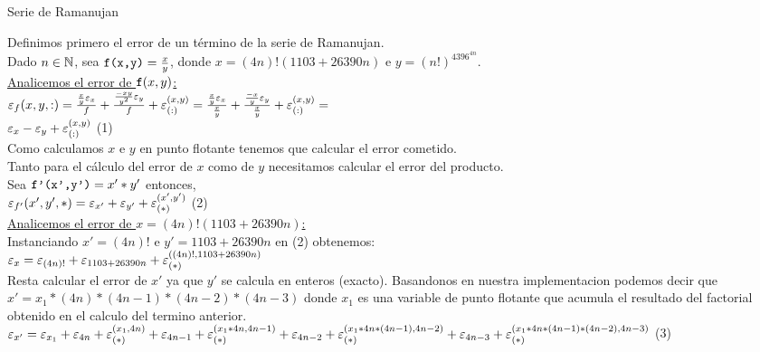 \begin{subsection}{Serie de Ramanujan}
	\large
	
	Definimos primero el error de un término de la serie de Ramanujan.\\

	Dado $n \in \mathbb{N}$, sea $\texttt{f(x,y)}=\frac{x}{y}$, donde $x=(4n)!(1103+26390n)$ e $y=(n!)^4396^{4n}$.\\
	
	\underline{Analicemos el error de $\texttt{f}(x,y)$:}\\
	
	$\texttt{$\varepsilon _{f}({x,y,:})$}=\frac{\frac{x}{y}\varepsilon _{x}}{f} + \frac{\frac{-xy}{y^2}\varepsilon _{y}}{f} + \varepsilon _{({:})}^{({x,y})} = 
	\frac{\frac{x}{y}\varepsilon _{x}}{\frac{x}{y}} + \frac{\frac{-x}{y}\varepsilon _{y}}{\frac{x}{y}} + \varepsilon _{({:})}^{({x,y})} =$\\
	
	$\varepsilon _{x} - \varepsilon _{y} + \varepsilon _{({:})}^{({x,y})}$	(1)\\
	
	Como calculamos $x$ e $y$ en punto flotante tenemos que calcular el error cometido.\\ Tanto para el cálculo del error de $x$ como de $y$ necesitamos calcular el error del producto.\\
	
	Sea $\texttt{f'(x',y')}=x'*y'$ entonces,\\
	
	$\texttt{$\varepsilon _{f'}({x',y',*})$}=\varepsilon _{x'}+\varepsilon _{y'}+\varepsilon _{({*})}^{({x',y'})}$	(2)\\
	
	\underline{Analicemos el error de $x=(4n)!(1103+26390n)$:}\\
	
	Instanciando $x'=(4n)!$ e $y'=1103+26390n$ en (2) obtenemos:\\

	$\varepsilon _{x} = {\varepsilon _{(4n)!}+\varepsilon _{1103+26390n}+\varepsilon _{({*})}^{({(4n)!,1103+26390n})}}$\\
	
	Resta calcular el error de $x'$ ya que $y'$ se calcula en enteros (exacto). Basandonos en nuestra implementacion podemos decir que $x'=x_1*(4n)*(4n-1)*(4n-2)*(4n-3)$ donde $x_1$ es una variable de punto flotante que acumula el resultado del factorial obtenido en el calculo del termino anterior.\\
	
	$\varepsilon _{x'} =\varepsilon _{x_1}+\varepsilon _{4n}+\varepsilon _{({*})}^{({x_1,4n})}+\varepsilon _{4n-1}+\varepsilon _{({*})}^{({x_1*4n,4n-1})}+\varepsilon _{4n-2}+\varepsilon _{({*})}^{({x_1*4n*(4n-1),4n-2})}+\varepsilon _{4n-3}+\varepsilon _{({*})}^{({x_1*4n*(4n-1)*(4n-2),4n-3})}$	(3)\\
	

\end{subsection}
